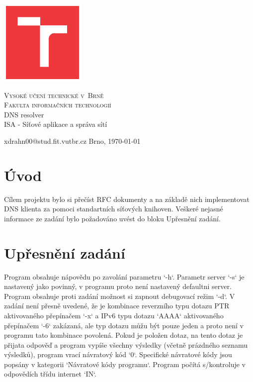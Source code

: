 \documentclass[a4paper,11pt]{article}
\begin{document}
\begin{titlepage}

	\begin{center}

        \includegraphics[width=4.1cm,keepaspectratio,trim={1.2cm 1.2cm 1.2cm 1.2cm},clip]{./template-fig/VUT_symbol_barevne_CMYK_CZ}%

		{\Huge\textsc{Vysoké učení technické v~Brně}}\\
		\medskip
		{\huge\textsc{Fakulta informačních technologií}}\\
		{\huge DNS resolver}\\
		\medskip
		{\LARGE ISA - Síťové aplikace a správa sítí}\\
	\end{center}

    \noindent xdrahn00@stud.fit.vutbr.cz \Large {\hfill Brno, \today}

\end{titlepage}

\section{Úvod}

Cílem projektu bylo si přečíst RFC dokumenty a na základě nich implementovat DNS klienta za pomoci standartních síťových knihoven. Veškeré nejasné informace ze zadání bylo požadováno uvést do bloku Upřesnění zadání.

\section{Upřesnění zadání}

Program obsahuje nápovědu po zavolání parametru `-h`. Parametr server `-s` je nastavený jako povinný, v programu proto není nastavený defaultni server. Program obsahuje proti zadání možnost si zapnout debugovací režim `-d`. V zadání není přesně uvedené, že je kombinace reverzního typu dotazu PTR aktivovaného přepínačem `-x` a IPv6 typu dotazu `AAAA` aktivovaného přepínačem `-6` zakázaná, ale typ dotazu můžu být pouze jeden a proto není v programu tato kombinace povolená. Pokud je položen dotaz, na tento dotaz je přijata odpověď a program vypíše všechny výsledky (včetně prázdného seznamu výsledků), program vrací návratový kód `0`. Specifické návratové kódy jsou popsány v kategorii `Návratové kódy programu`. Program počítá s/kontroluje v odpovědích třídu internet `IN`.
\end{document}
